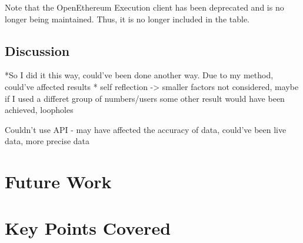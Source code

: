 \begin{table}[!htb]
    \centering

    \caption{An updated table of client diversity within Ethereum Mainnet network, data recorded on 27-Mar 23. Updates the table from report \cite{CCRI:Network} }
  \label{Table:tabsubex}
\end{table}

Note that the OpenEthereum Execution client has been deprecated and is no longer being maintained. Thus, it is no longer included in the table.

\subsection{Discussion}
*So I did it this way, could've been done another way. Due to my method, could've affected results
* self reflection -> smaller factors not considered, maybe if I used a differet group of numbers/users some other result would have been achieved, loopholes


Couldn't use API - may have affected the accuracy of data, could've been live data, more precise data




\section{Future Work}
\section{Key Points Covered}
